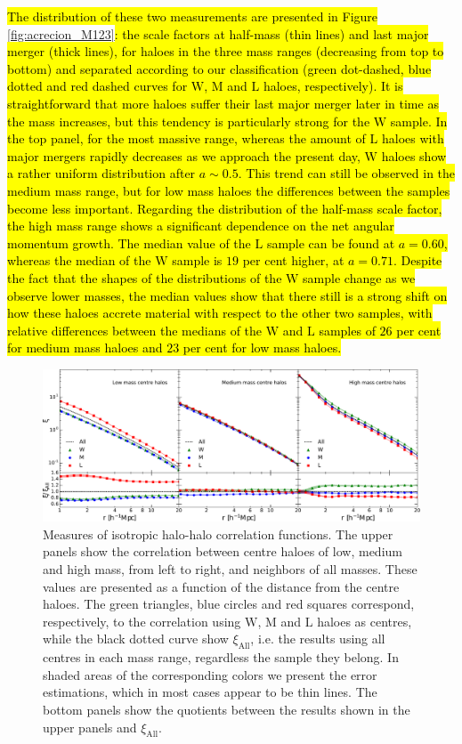 \documentclass[fleqn,usenatbib]{mnras}
\newcommand{\Wh}{\mathrm{W}}
\newcommand{\Lh}{\mathrm{L}}
\newcommand{\Mh}{\mathrm{M}}
\begin{document}
\hl{The distribution of these two measurements are presented in Figure }\ref{fig:acrecion_M123}\hl{: the scale factors at half-mass (thin lines) and last major merger (thick lines), for haloes in the three mass ranges (decreasing from top to bottom) and separated according to our classification (green dot-dashed, blue dotted and red dashed curves for $\Wh$, $\Mh$ and $\Lh$ haloes, respectively). It is straightforward that more haloes suffer their last major merger later in time as the mass increases, but this tendency is particularly strong for the $\Wh$ sample. In the top panel, for the most massive range, whereas the amount of $\Lh$ haloes with major mergers rapidly decreases as we approach the present day, $\Wh$ haloes show a rather uniform distribution after $a\sim 0.5$. This trend can still be observed in the medium mass range, but for low mass haloes the differences between the samples become less important.
Regarding the distribution of the half-mass scale factor, the high mass range shows a significant dependence on the net angular momentum growth. The median value of the $\Lh$ sample can be found at $a=0.60$, whereas the median of the $\Wh$ sample is $19$ per cent higher, at $a=0.71$. Despite the fact that the shapes of the distributions of the $\Wh$ sample change as we observe lower masses, the median values show that there still is a strong shift on how these haloes accrete material with respect to the other two samples, with relative differences between the medians of the $\Wh$ and $\Lh$ samples of $26$ per cent for medium mass haloes and $23$ per cent for low mass haloes.}

\begin{figure}
	\includegraphics[width=2\columnwidth]{400Mpc_figs/panel_M123_iso_color.pdf}
    \caption{Measures of isotropic halo-halo correlation functions. The upper panels show the correlation between centre haloes of low, medium and high mass, from left to right, and neighbors of all masses. These values are presented as a function of the distance from the centre haloes. The green triangles, blue circles and red squares correspond, respectively, to the correlation using $\Wh$, $\Mh$ and $\Lh$ haloes as centres, while the black dotted curve show $\xi_\mathrm{All}$, i.e. the results using all centres in each mass range, regardless the sample they belong. In shaded areas of the corresponding colors we present the error estimations, which in most cases appear to be thin lines. The bottom panels show the quotients between the results shown in the upper panels and $\xi_\mathrm{All}$.}
    \label{fig:iso_M123}
\end{figure}
\end{document}
